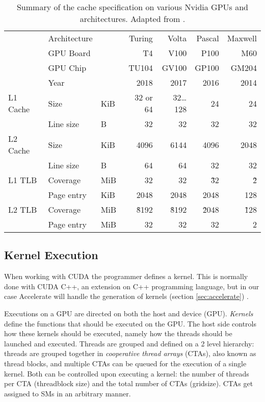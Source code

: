 \begin{table}
    \centering
    \begin{tabular}{l l l|r r r r}
        & Architecture & &    Turing &      Volta & Pascal & Maxwell
        \\
        & GPU Board    & &        T4 &       V100 &   P100 &     M60
        \\
        & GPU Chip     & &     TU104 &      GV100 &  GP100 &   GM204
        \\
        & Year         & &      2018 &       2017 &   2016 &    2014
        \\
        \hline
        L1 Cache%
        & Size     & KiB &  32 or 64 & 32\dots128 &     24 &      24
        \\
        & Line size  & B &        32 &         32 &     32 &      32
        \\
        \hline
        L2 Cache%
        & Size     & KiB &      4096 &      6144 &   4096 &    2048
        \\
        & Line size  & B &        64 &        64 &     32 &      32
        \\
        \hline
        L1 TLB%
        & Coverage   & MiB &      32 &        32 &   \~32 &     \~2
        \\
        & Page entry & KiB &    2048 &    2048   &   2048 &     128
        \\
        \hline
        L2 TLB%
        & Coverage   & MiB &  \~8192 &  \~8192   & \~2048 &   \~128
        \\
        & Page entry & MiB &      32 &      32   &     32 &       2
    \end{tabular}
    \caption{
        Summary of the cache specification on various Nvidia GPUs and architectures. 
        Adapted from \citeauthor{jia2019dissecting}\cite{jia2019dissecting}.
    }
\end{table}

\subsection{Kernel Execution}
\label{sec:kernel_execution}
When working with CUDA the programmer defines a kernel.
This is normally done with CUDA C++, an extension on C++ programming language, but in our case Accelerate will handle the generation of kernels (section \ref{sec:accelerate}) \cite{nvidia2021cudadocs}.

Executions on a GPU are directed on both the host and device (GPU).
\textit{Kernels} define the functions that should be executed on the GPU.
The host side controls how these kernels should be executed, namely how the threads should be launched and executed.
Threads are grouped and defined on a 2 level hierarchy: threads are grouped together in \textit{cooperative thread arrays} (CTAs), also known as thread blocks, and multiple CTAs can be queued for the execution of a single kernel.
Both can be controlled upon executing a kernel: the number of threads per CTA (threadblock size) and the total number of CTAs (gridsize).
CTAs get assigned to SMs in an arbitrary manner.

